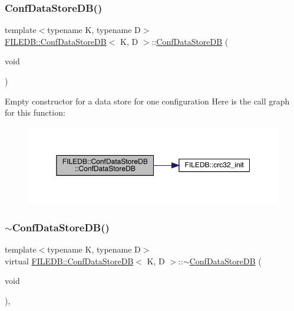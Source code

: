 \subsubsection{\texorpdfstring{ConfDataStoreDB()}{ConfDataStoreDB()}\hspace{0.1cm}{\footnotesize\ttfamily [1/2]}}
{\footnotesize\ttfamily template$<$typename K, typename D$>$ \\
\mbox{\hyperlink{classFILEDB_1_1ConfDataStoreDB}{F\+I\+L\+E\+D\+B\+::\+Conf\+Data\+Store\+DB}}$<$ K, D $>$\+::\mbox{\hyperlink{classFILEDB_1_1ConfDataStoreDB}{Conf\+Data\+Store\+DB}} (\begin{DoxyParamCaption}\item[{void}]{ }\end{DoxyParamCaption})\hspace{0.3cm}{\ttfamily [inline]}}

Empty constructor for a data store for one configuration Here is the call graph for this function\+:
\nopagebreak
\begin{figure}[H]
\begin{center}
\leavevmode
\includegraphics[width=350pt]{d8/d19/classFILEDB_1_1ConfDataStoreDB_a575d901daeccae08bcda5b2a60681e1b_cgraph}
\end{center}
\end{figure}
\mbox{\label{classFILEDB_1_1ConfDataStoreDB_a39b48750dbc9bd0d4ca8c9787edee897}} 
\subsubsection{\texorpdfstring{$\sim$ConfDataStoreDB()}{~ConfDataStoreDB()}\hspace{0.1cm}{\footnotesize\ttfamily [1/2]}}
{\footnotesize\ttfamily template$<$typename K, typename D$>$ \\
virtual \mbox{\hyperlink{classFILEDB_1_1ConfDataStoreDB}{F\+I\+L\+E\+D\+B\+::\+Conf\+Data\+Store\+DB}}$<$ K, D $>$\+::$\sim$\mbox{\hyperlink{classFILEDB_1_1ConfDataStoreDB}{Conf\+Data\+Store\+DB}} (\begin{DoxyParamCaption}\item[{void}]{ }\end{DoxyParamCaption})\hspace{0.3cm}{\ttfamily [inline]}, {\ttfamily [virtual]}}


